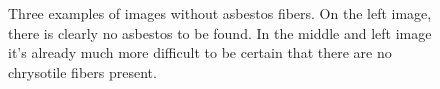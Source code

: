 \begin{figure}[h]
\centering
\caption{Three examples of images without asbestos fibers. On the left image, there is clearly no asbestos to be found. In the middle and left image it's already much more difficult to be certain that there are no chrysotile fibers present.}
\label{fig:non-asbestos_examples}
\end{figure}

